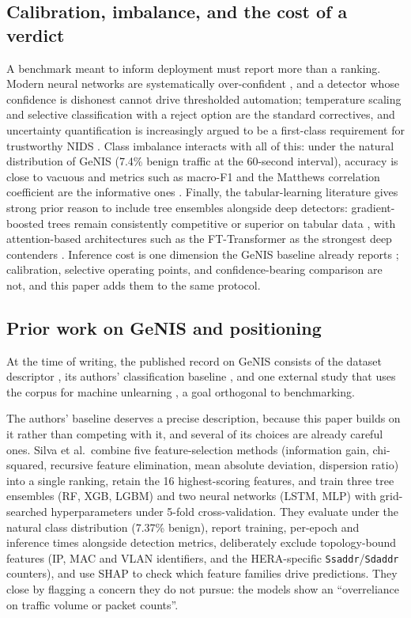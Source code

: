 \documentclass[review,12pt]{elsarticle}
\begin{document}
\subsection{Calibration, imbalance, and the cost of a verdict}
A benchmark meant to inform deployment must report more than a ranking.
Modern neural networks are systematically over-confident
\cite{guo2017calibration}, and a detector whose confidence is dishonest
cannot drive thresholded automation; temperature scaling
\cite{guo2017calibration} and selective classification with a reject option
\cite{geifman2017selective,hendrickx2024reject} are the standard correctives,
and uncertainty quantification is increasingly argued to be a first-class
requirement for trustworthy NIDS \cite{talpini2024uncertainty}. Class
imbalance interacts with all of this: under the natural distribution of
GeNIS (7.4\% benign traffic at the 60-second interval), accuracy is close to
vacuous and metrics such as macro-F1 and the Matthews correlation
coefficient are the informative ones \cite{chicco2020mcc}. Finally, the
tabular-learning literature gives strong prior reason to include tree
ensembles alongside deep detectors: gradient-boosted trees remain
consistently competitive or superior on tabular data
\cite{grinsztajn2022trees,shwartzziv2022tabular}, with attention-based
architectures such as the FT-Transformer as the strongest deep contenders
\cite{gorishniy2021ftt}. Inference cost is one dimension the GeNIS baseline
already reports \cite{silva2025binary}; calibration, selective operating
points, and confidence-bearing comparison are not, and this paper adds them
to the same protocol.

\subsection{Prior work on GeNIS and positioning}
At the time of writing, the published record on GeNIS consists of the
dataset descriptor \cite{silva2025genis}, its authors' classification
baseline \cite{silva2025binary}, and one external study that uses the corpus
for machine unlearning \cite{magalhaes2026unlearning}, a goal orthogonal to
benchmarking.

The authors' baseline deserves a precise description, because this paper
builds on it rather than competing with it, and several of its choices are
already careful ones. Silva et al.\ combine five feature-selection methods
(information gain, chi-squared, recursive feature elimination, mean absolute
deviation, dispersion ratio) into a single ranking, retain the 16
highest-scoring features, and train three tree ensembles (RF, XGB, LGBM) and
two neural networks (LSTM, MLP) with grid-searched hyperparameters under
5-fold cross-validation. They evaluate under the natural class distribution
(7.37\% benign), report training, per-epoch and inference times alongside
detection metrics, deliberately exclude topology-bound features (IP, MAC
and VLAN identifiers, and the HERA-specific \texttt{Ssaddr}/\texttt{Sdaddr}
counters), and use SHAP to check which feature families drive predictions.
They close by flagging a concern they do not pursue: the models show an
``overreliance on traffic volume or packet counts''.
\end{document}
